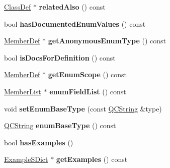 \begin{DoxyCompactItemize}
\item 
\hypertarget{class_member_def_aa533657737e04b5575ba2f2748fc2e2b}{\hyperlink{class_class_def}{Class\-Def} $\ast$ {\bfseries related\-Also} () const }\label{class_member_def_aa533657737e04b5575ba2f2748fc2e2b}

\item 
\hypertarget{class_member_def_afb57b17aa62282ec237b3a1832edd6ca}{bool {\bfseries has\-Documented\-Enum\-Values} () const }\label{class_member_def_afb57b17aa62282ec237b3a1832edd6ca}

\item 
\hypertarget{class_member_def_a61d889cb4a58fcc8ab1225d14c845422}{\hyperlink{class_member_def}{Member\-Def} $\ast$ {\bfseries get\-Anonymous\-Enum\-Type} () const }\label{class_member_def_a61d889cb4a58fcc8ab1225d14c845422}

\item 
\hypertarget{class_member_def_a99d5f9772aebf20cea992924077e975d}{bool {\bfseries is\-Docs\-For\-Definition} () const }\label{class_member_def_a99d5f9772aebf20cea992924077e975d}

\item 
\hypertarget{class_member_def_a755d1d2713a2694e50e9a76e3c0d7f49}{\hyperlink{class_member_def}{Member\-Def} $\ast$ {\bfseries get\-Enum\-Scope} () const }\label{class_member_def_a755d1d2713a2694e50e9a76e3c0d7f49}

\item 
\hypertarget{class_member_def_a4ebdcd9db34fe93b83b72adeb6509c3a}{\hyperlink{class_member_list}{Member\-List} $\ast$ {\bfseries enum\-Field\-List} () const }\label{class_member_def_a4ebdcd9db34fe93b83b72adeb6509c3a}

\item 
\hypertarget{class_member_def_ae6674ba0bc7403b6dac65154e0986f0c}{void {\bfseries set\-Enum\-Base\-Type} (const \hyperlink{class_q_c_string}{Q\-C\-String} \&type)}\label{class_member_def_ae6674ba0bc7403b6dac65154e0986f0c}

\item 
\hypertarget{class_member_def_a7fbaac55be7d0189ac4ce094d47a2951}{\hyperlink{class_q_c_string}{Q\-C\-String} {\bfseries enum\-Base\-Type} () const }\label{class_member_def_a7fbaac55be7d0189ac4ce094d47a2951}

\item 
\hypertarget{class_member_def_aedb1f21e05c55f8b390afce2c4b456d9}{bool {\bfseries has\-Examples} ()}\label{class_member_def_aedb1f21e05c55f8b390afce2c4b456d9}

\item 
\hypertarget{class_member_def_a02b5e94ada4b0e05383dbe689881e978}{\hyperlink{class_example_s_dict}{Example\-S\-Dict} $\ast$ {\bfseries get\-Examples} () const }\label{class_member_def_a02b5e94ada4b0e05383dbe689881e978}


\end{DoxyCompactItemize}
